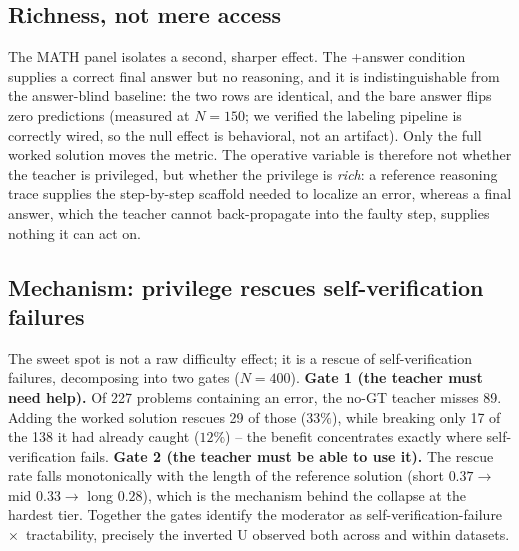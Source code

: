 \documentclass{article}
\begin{document}
\subsection{Richness, not mere access}
The MATH panel isolates a second, sharper effect. The +answer condition supplies a
correct final answer but no reasoning, and it is indistinguishable from the
answer-blind baseline: the two rows are identical, and the bare answer flips
zero predictions (measured at $N=150$; we verified the labeling pipeline is
correctly wired, so the null effect is behavioral, not an artifact). Only
the full worked solution moves the metric. The operative variable is
therefore not whether the teacher is privileged, but whether the privilege
is \emph{rich}: a reference reasoning trace supplies the step-by-step
scaffold needed to localize an error, whereas a final answer, which the
teacher cannot back-propagate into the faulty step, supplies nothing it can
act on.

\subsection{Mechanism: privilege rescues self-verification failures}
\label{sec:mechanism}
The sweet spot is not a raw difficulty effect; it is a rescue of
self-verification failures, decomposing into two gates ($N=400$). \textbf{Gate
1 (the teacher must need help).} Of 227 problems containing an error, the
no-GT teacher misses 89. Adding the worked solution rescues 29 of those
($33\%$), while breaking only 17 of the 138 it had already caught ($12\%$) --
the benefit concentrates exactly where self-verification fails. \textbf{Gate
2 (the teacher must be able to use it).} The rescue rate falls monotonically
with the length of the reference solution (short $0.37 \to$ mid $0.33 \to$
long $0.28$), which is the mechanism behind the collapse at the hardest
tier. Together the gates identify the moderator as
self-verification-failure~$\times$~tractability, precisely the inverted U
observed both across and within datasets.
\end{document}
